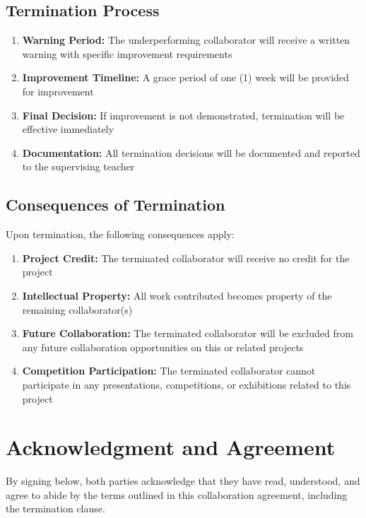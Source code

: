 \documentclass[12pt,a4paper]{article}
\begin{document}
\subsection*{Termination Process}

\begin{enumerate}
    \item \textbf{Warning Period:} The underperforming collaborator will receive a written warning with specific improvement requirements
    \item \textbf{Improvement Timeline:} A grace period of one (1) week will be provided for improvement
    \item \textbf{Final Decision:} If improvement is not demonstrated, termination will be effective immediately
    \item \textbf{Documentation:} All termination decisions will be documented and reported to the supervising teacher
\end{enumerate}

\subsection*{Consequences of Termination}

Upon termination, the following consequences apply:

\begin{enumerate}
    \item \textbf{Project Credit:} The terminated collaborator will receive no credit for the project
    \item \textbf{Intellectual Property:} All work contributed becomes property of the remaining collaborator(s)
    \item \textbf{Future Collaboration:} The terminated collaborator will be excluded from any future collaboration opportunities on this or related projects
    \item \textbf{Competition Participation:} The terminated collaborator cannot participate in any presentations, competitions, or exhibitions related to this project
\end{enumerate}

\vspace{1cm}

\section*{Acknowledgment and Agreement}

By signing below, both parties acknowledge that they have read, understood, and agree to abide by the terms outlined in this collaboration agreement, including the termination clause.
\end{document}
